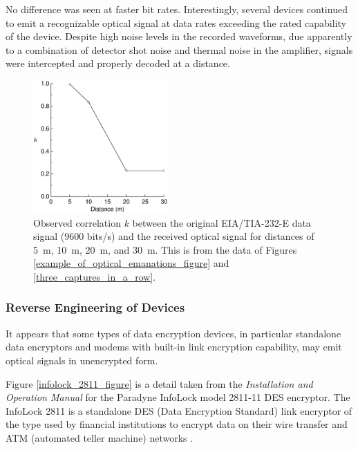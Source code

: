 \documentclass{acmtrans2e}
\begin{document}
No difference was seen at faster bit rates.  Interestingly, several devices
continued to emit a recognizable optical signal at data rates exceeding the
rated capability of the device.  Despite high noise levels in the recorded
waveforms, due apparently to a combination of detector shot noise and thermal
noise in the amplifier, signals were intercepted and properly decoded at a
distance.

\begin{figure}
\centering
\includegraphics[height=2in]{Figure_7.eps}
\caption{Observed correlation $k$ between the original EIA/TIA-232-E
data signal (9600 bits/s) and the received optical signal for
distances of 5~m, 10~m, 20~m, and 30~m.
This is from the data of Figures \ref{example_of_optical_emanations_figure}
and \ref{three_captures_in_a_row}.}
\label{correlation_figure}
\end{figure}

\subsubsection{Reverse Engineering of Devices}

It appears that some types of data encryption devices, in particular 
stand\-alone data encryptors and modems with built-in link encryption 
capability, may emit optical signals in unencrypted form.

Figure \ref{infolock_2811_figure} is a detail taken from the {\it 
Installation and Operation Manual} for the Paradyne InfoLock model
2811-11 DES encryptor.  The InfoLock 2811 is a stand\-alone DES (Data 
Encryption Standard) link encryptor of the type used by financial 
institutions to encrypt data on their wire transfer and ATM (automated
teller machine) networks \cite{Paradyne1985}.
\end{document}
